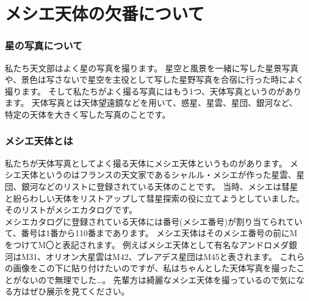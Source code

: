 \documentclass[../main]{subfiles}
\begin{document}
\chapter{メシエ天体の欠番について} %

\small
\subsection*{星の写真について}
私たち天文部はよく星の写真を撮ります。
星空と風景を一緒に写した星景写真や、景色は写さないで星空を主役として写した星野写真を合宿に行った時によく撮ります。
そして私たちがよく撮る写真にはもう1つ、天体写真というのがあります。
天体写真とは天体望遠鏡などを用いて、惑星、星雲、星団、銀河など、特定の天体を大きく写した写真のことです。

\subsection*{メシエ天体とは}
私たちが天体写真としてよく撮る天体にメシエ天体というものがあります。
メシエ天体というのはフランスの天文家であるシャルル・メシエが作った星雲、星団、銀河などのリストに登録されている天体のことです。
当時、メシエは彗星と紛らわしい天体をリストアップして彗星探索の役に立てようとしていました。
そのリストがメシエカタログです。\\
メシエカタログに登録されている天体には番号(メシエ番号)が割り当てられていて、番号は1番から110番まであります。
メシエ天体はそのメシエ番号の前にMをつけてM〇と表記されます。
例えばメシエ天体として有名なアンドロメダ銀河はM31、オリオン大星雲はM42、プレアデス星団はM45と表されます。
これらの画像をこの下に貼り付けたいのですが、私はちゃんとした天体写真を撮ったことがないので無理でした…。
先輩方は綺麗なメシエ天体を撮っているので気になる方はぜひ展示を見てください。
\end{document}
